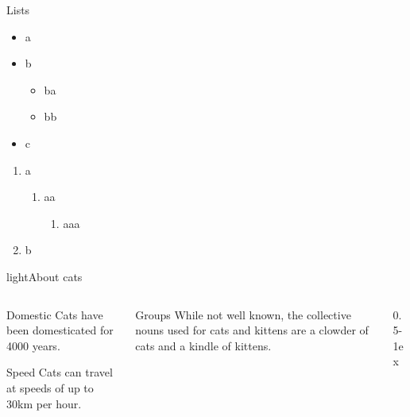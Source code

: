 \documentclass{beamerx}
\begin{document}
\begin{frame}{Lists}

  \begin{itemize}
    \item a
    \item b
      \begin{itemize}
        \item ba
        \item bb
      \end{itemize}
    \item c
  \end{itemize}

  \begin{enumerate}
    \item a
      \begin{enumerate}
        \item aa
          \begin{enumerate}
            \item aaa
          \end{enumerate}
      \end{enumerate}
    \item b
  \end{enumerate}
\end{frame}

\begin{picframe}[lightbw]{light}{About cats}
  \begin{columns}[t,onlytextwidth]
    \begin{column}{0.25\textwidth}
      \begin{block}{Domestic}
        Cats have been domesticated for 4000 years.
      \end{block}
      \begin{block}{Speed}
        Cats can travel at speeds of up to 30km per hour.
      \end{block}
    \end{column}
    \begin{column}{0.25\textwidth}
      \begin{block}{Groups}
        While not well known, the collective nouns used for cats and kittens are a clowder of cats and a kindle of kittens.
      \end{block}
    \end{column}
    \begin{column}{0.5\textwidth-1ex}
    \end{column}
  \end{columns}
\end{picframe}
\end{document}
